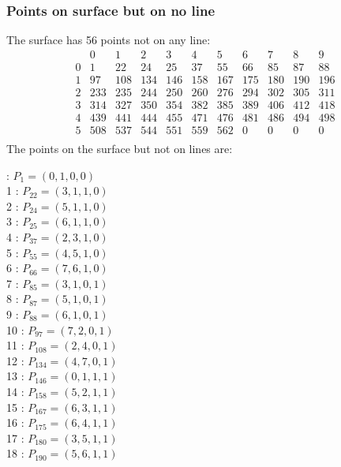 \documentclass{article}
\begin{document}
{\subsubsection*{Points on surface but on no line}
The surface has 56 points not on any line:\\
$$
\begin{array}{r|*{10}{r}}
 & 0 & 1 & 2 & 3 & 4 & 5 & 6 & 7 & 8 & 9\\
\hline
0 & 1 & 22 & 24 & 25 & 37 & 55 & 66 & 85 & 87 & 88\\
1 & 97 & 108 & 134 & 146 & 158 & 167 & 175 & 180 & 190 & 196\\
2 & 233 & 235 & 244 & 250 & 260 & 276 & 294 & 302 & 305 & 311\\
3 & 314 & 327 & 350 & 354 & 382 & 385 & 389 & 406 & 412 & 418\\
4 & 439 & 441 & 444 & 455 & 471 & 476 & 481 & 486 & 494 & 498\\
5 & 508 & 537 & 544 & 551 & 559 & 562 & 0 & 0 & 0 & 0\\
\end{array}
$$
The points on the surface but not on lines are:\\
\begin{multicols}{2}
 : $P_{1}=( 0, 1, 0, 0 )$\\
1 : $P_{22}=( 3, 1, 1, 0 )$\\
2 : $P_{24}=( 5, 1, 1, 0 )$\\
3 : $P_{25}=( 6, 1, 1, 0 )$\\
4 : $P_{37}=( 2, 3, 1, 0 )$\\
5 : $P_{55}=( 4, 5, 1, 0 )$\\
6 : $P_{66}=( 7, 6, 1, 0 )$\\
7 : $P_{85}=( 3, 1, 0, 1 )$\\
8 : $P_{87}=( 5, 1, 0, 1 )$\\
9 : $P_{88}=( 6, 1, 0, 1 )$\\
10 : $P_{97}=( 7, 2, 0, 1 )$\\
11 : $P_{108}=( 2, 4, 0, 1 )$\\
12 : $P_{134}=( 4, 7, 0, 1 )$\\
13 : $P_{146}=( 0, 1, 1, 1 )$\\
14 : $P_{158}=( 5, 2, 1, 1 )$\\
15 : $P_{167}=( 6, 3, 1, 1 )$\\
16 : $P_{175}=( 6, 4, 1, 1 )$\\
17 : $P_{180}=( 3, 5, 1, 1 )$\\
18 : $P_{190}=( 5, 6, 1, 1 )$\\

\end{multicols}}
\end{document}
